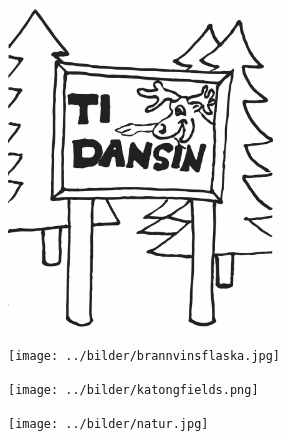 %


\begin{figure}[!b]
	\includegraphics[width=7cm]{../bilder/fardigabilder/BilderTillKapitel/tidansin.png} 
\end{figure}
\sclearpage

\sclearpage

\sclearpage

\sclearpage

\begin{figure}[!b]
\begin{center}
\texttt{[image: ../bilder/brannvinsflaska.jpg]} 
\end{center}
\end{figure}
\sclearpage

\sclearpage

\begin{figure}[!h]
\begin{center}
\texttt{[image: ../bilder/katongfields.png]} 
\end{center}
\end{figure}

\begin{figure}[!b]
\begin{center}
\texttt{[image: ../bilder/natur.jpg]} 
\end{center}
\end{figure}
\sclearpage

\sclearpage

\sclearpage

\sclearpage

%